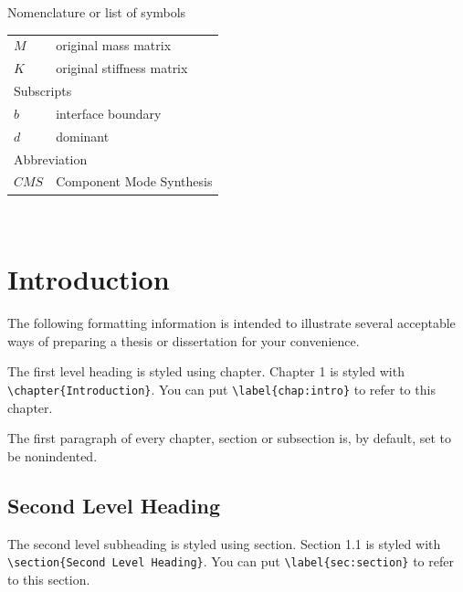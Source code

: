\documentclass[11pt]{report}
\theoremstyle{plain}
\theoremstyle{definition}
\theoremstyle{corollary}
\theoremstyle{definition}
\theoremstyle{plain}
\theoremstyle{definition}
\theoremstyle{plain}
\begin{document}
\listoffigures

\newpage
\begin{center}
\large
Nomenclature or list of symbols
\end{center}
\normalsize
\begin{tabular}{p{}p{}}
$M$	& original mass matrix\\
$K$	& original stiffness matrix\\[30pt]
\multicolumn{2}{l}{Subscripts}\\
$b$ & interface boundary\\
$d$ & dominant\\[30pt]
\multicolumn{2}{l}{Abbreviation}\\
$CMS$ & Component Mode Synthesis\\
\end{tabular}
\newpage 

\ %

\chapter{Introduction}\label{chap:intro}
The following formatting information is intended to illustrate several acceptable ways of preparing a thesis or dissertation for your convenience.

The first level heading is styled using chapter.
Chapter 1 is styled with\\ \verb|\chapter{Introduction}|.
You can put \verb|\label{chap:intro}| to refer to this chapter.

The first paragraph of every chapter, section or subsection is, by default, set to be nonindented.

\section{Second Level Heading}\label{sec:section}
The second level subheading is styled using section.
Section 1.1 is styled with \verb|\section{Second Level Heading}|.
You can put \verb|\label{sec:section}| to refer to this section.
\end{document}
